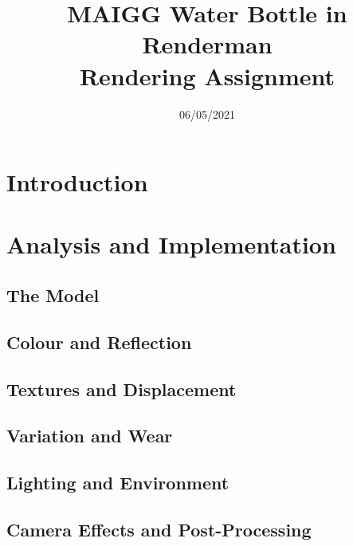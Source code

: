 \documentclass[notitlepage,12pt]{article}
\title{%
MAIGG Water Bottle in Renderman  \\
\large Rendering Assignment}
\author{}
\date{06/05/2021}
\begin{document}
\maketitle




\section{Introduction}

\section{Analysis and Implementation}


\subsection{The Model}

\subsection{Colour and Reflection}

\subsection{Textures and Displacement}

\subsection{Variation and Wear}

\subsection{Lighting and Environment}

\subsection{Camera Effects and Post-Processing}
\end{document}
